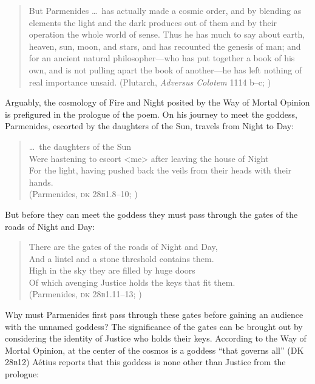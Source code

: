 \begin{quote}
    But Parmenides \ldots\ has actually made a cosmic order, and by blending as elements the light and the dark produces out of them and by their operation the whole world of sense. Thus he has much to say about earth, heaven, sun, moon, and stars, and has recounted the genesis of man; and for an ancient natural philosopher---who has put together a book of his own, and is not pulling apart the book of another---he has left nothing of real importance unsaid. (Plutarch, \emph{Adversus Colotem} 1114 b--c; \citealt[231]{Einarson:1967zr})
\end{quote}

Arguably, the cosmology of Fire and Night posited by the Way of Mortal Opinion is prefigured in the prologue of the poem. On his journey to meet the goddess, Parmenides, escorted by the daughters of the Sun, travels from Night to Day:
\begin{verse}
    \ldots\ the daughters of the Sun\\
    Were hastening to escort <me> after leaving the house of Night\\
    For the light, having pushed back the veils from their heads with their hands.\\ 
    (Parmenides, \textsc{dk} 28\textsc{b}1.8--10; \citealt[151]{McKirahan:1994ve})
\end{verse}
But before they can meet the goddess they must pass through the gates of the roads of Night and Day:
\begin{verse}
    There are the gates of the roads of Night and Day,\\
    And a lintel and a stone threshold contains them.\\ 
    High in the sky they are filled by huge doors\\
    Of which avenging Justice holds the keys that fit them.\\
    (Parmenides, \textsc{dk} 28\textsc{b}1.11--13; \citealt[151]{McKirahan:1994ve})
\end{verse}
Why must Parmenides first pass through these gates before gaining an audience with the unnamed goddess? The significance of the gates can be brought out by considering the identity of Justice who holds their keys. According to the Way of Mortal Opinion, at the center of the cosmos is a goddess ``that governs all'' (DK 28\textsc{b}12)  A\'{e}tius reports that this goddess is none other than Justice from the prologue:
